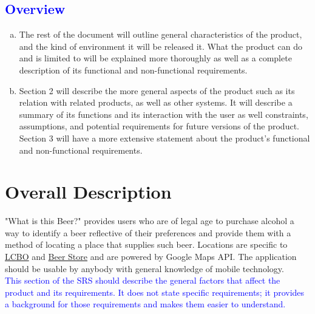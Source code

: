 \documentclass[]{article}
\begin{document}
\subsection{\textcolor{blue}{Overview}}
\label{sub:overview}
\begin{enumerate}[a)]
	\item  The rest of the document will outline general characteristics of the product, and the kind of environment it will be released it. What the product can do and is limited to will be explained more thoroughly as well as a complete description of its functional and non-functional requirements.
	\item Section 2 will describe the more general aspects of the product such as its relation with related products, as well as other systems. It will describe a summary of its functions and its interaction with the user as well constraints, assumptions, and potential requirements for future versions of the product. Section 3 will have a more extensive statement about the product's functional and non-functional requirements.
\end{enumerate}


\section{Overall Description}
\label{sec:overall_description}

"What is this Beer?" provides users who are of legal age to purchase alcohol a way to identify a beer reflective of their preferences and provide them with a method of locating a place that supplies such beer. Locations are specific to \underline{LCBO} and \underline{Beer Store} and are powered by Google Maps API. The application should be usable by anybody with general knowledge of mobile technology. \\

\textcolor{blue}{This section of the SRS should describe the general factors that affect the product and its requirements. It does not state specific requirements; it provides a background for those requirements and makes them easier to understand.}
\end{document}
